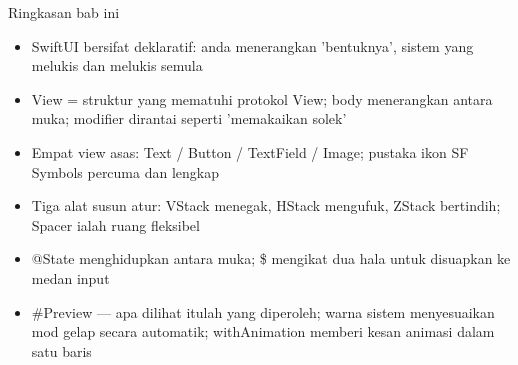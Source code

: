 \begin{tcbsummary}{Ringkasan bab ini}
\begin{itemize}
  \item SwiftUI bersifat deklaratif: anda menerangkan 'bentuknya', sistem yang melukis dan melukis semula
  \item View = struktur yang mematuhi protokol View; body menerangkan antara muka; modifier dirantai seperti 'memakaikan solek'
  \item Empat view asas: Text / Button / TextField / Image; pustaka ikon SF Symbols percuma dan lengkap
  \item Tiga alat susun atur: VStack menegak, HStack mengufuk, ZStack bertindih; Spacer ialah ruang fleksibel
  \item @State menghidupkan antara muka; \$ mengikat dua hala untuk disuapkan ke medan input
  \item \#Preview — apa dilihat itulah yang diperoleh; warna sistem menyesuaikan mod gelap secara automatik; withAnimation memberi kesan animasi dalam satu baris
\end{itemize}

\end{tcbsummary}
